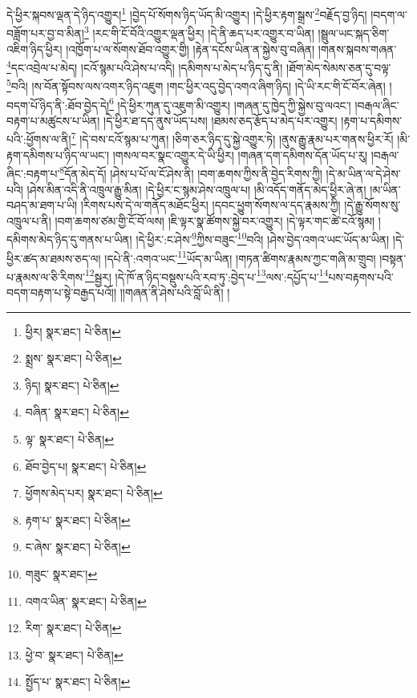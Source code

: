 དེ་ཕྱིར་སྐབས་ལྡན་དེ་ཉིད་འགྱུར།\footnote{ཕྱིར།  སྣར་ཐང་།  པེ་ཅིན། } །བྱེད་པོ་སོགས་ཉིད་ཡོད་མི་འགྱུར། །དེ་ཕྱིར་རྟག་སྒྲས་\footnote{སྨྲས་  སྣར་ཐང་།  པེ་ཅིན། }བརྗོད་བྱ་ཉིད། །བདག་ལ་བཟློག་པར་བྱ་བ་མིན།\footnote{ཉིད།  སྣར་ཐང་།  པེ་ཅིན། } །རང་གི་ངོ་བོའི་འགྱུར་ལྡན་ཕྱིར། །དེ་ནི་ཆད་པར་འགྱུར་བ་ཡིན། །སྦྲུལ་ཡང་སྐད་ཅིག་འཇིག་ཉིད་ཕྱིར། །འཁྱོག་པ་ལ་སོགས་ཐོབ་འགྱུར་གྱི། །རྟེན་དངོས་ཡིན་ན་སྐྱེས་བུ་བཞིན། །གནས་སྐབས་གཞན་\footnote{བཞིན་  སྣར་ཐང་།  པེ་ཅིན། }དང་འབྲེལ་པ་མེད། །ངའོ་སྙམ་པའི་ཤེས་པ་འདི། །དམིགས་པ་མེད་པ་ཉིད་དུ་ནི། །ཐོག་མེད་སེམས་ཅན་དུ་བལྟ་\footnote{ལྟ་  སྣར་ཐང་།  པེ་ཅིན། }བའི། །ས་བོན་སྟོབས་ལས་འགར་ཉིད་འཇུག །གང་ཕྱིར་འདུ་བྱེད་འགའ་ཞིག་ཉིད། །དེ་ཡི་རང་གི་ངོ་བོར་ཞེན། །བདག་པོ་ཉིད་ནི་:ཐོབ་བྱེད་དེ།\footnote{ཐོབ་བྱེད་པ།  སྣར་ཐང་།  པེ་ཅིན། } །དེ་ཕྱིར་ཀུན་དུ་འཇུག་མི་འགྱུར། །གཞན་དུ་ཁྱེད་ཀྱི་སྐྱེས་བུ་ལའང་། །བརྒལ་ཞིང་བརྟག་པ་མཚུངས་པ་ཡིན། །དེ་ཕྱིར་ཐ་དད་ནུས་ཡོད་པས། །ཐམས་ཅད་རྩོད་པ་མེད་པར་འགྱུར། །རྟག་པ་དམིགས་པའི་:ཕྱོགས་ལ་ནི།\footnote{ཕྱོགས་མེད་པར།  སྣར་ཐང་།  པེ་ཅིན། } །དེ་བས་ངའོ་སྙམ་པ་ཀུན། །ཅིག་ཅར་ཉིད་དུ་སྐྱེ་འགྱུར་ཏེ། །ནུས་རྒྱུ་རྣམ་པར་གནས་ཕྱིར་རོ། །མི་རྟག་དམིགས་པ་ཉིད་ལ་ཡང་། །གསལ་བར་སྣང་འགྱུར་དེ་ཡི་ཕྱིར། །གཞན་དག་དམིགས་དོན་ཡོད་པ་རུ། །བརྒལ་ཞིང་:བརྟག་པ་\footnote{རྟག་པ་  སྣར་ཐང་།  པེ་ཅིན། }དོན་མེད་དོ། །ཤེས་པ་པོ་ལ་ངོ་ཤེས་ནི། །བག་ཆགས་ཀྱིས་ནི་བྱེད་རིགས་ཀྱི། །དེ་མ་ཡིན་ལ་དེ་ཤེས་པའི། །ཤེས་མིན་འདི་ནི་འཁྲུལ་རྒྱུ་མིན། །དེ་ཕྱིར་ང་སྙམ་ཤེས་འཁྲུལ་པ། །མི་འདོད་གནོད་མེད་ཕྱིར་ཞེ་ན། །མ་ཡིན་བཤད་མ་ཐག་པ་ཡི། །རིགས་པས་དེ་ལ་གནོད་མཐོང་ཕྱིར། །དབང་ཕྱུག་སོགས་ལ་དད་རྣམས་ཀྱི། །དེ་རྒྱུ་སོགས་སུ་འཁྲུལ་པ་ནི། །བག་ཆགས་ཙམ་གྱི་ངོ་བོ་ལས། །ཇི་ལྟར་སྣ་ཚོགས་སྐྱེ་བར་འགྱུར། །དེ་ལྟར་གང་ཚེ་ངའོ་སྙམ། །དམིགས་མེད་ཉིད་དུ་གནས་པ་ཡིན། །དེ་ཕྱིར་:ང་ཤེས་\footnote{ང་ཞེས་  སྣར་ཐང་།  པེ་ཅིན། }ཀྱིས་བཟུང་\footnote{གཟུང་  སྣར་ཐང་། }བའི། །ཤེས་བྱེད་འགའ་ཡང་ཡོད་མ་ཡིན། །དེ་ཕྱིར་ཚད་མ་ཐམས་ཅད་ལ། །དཔེ་ནི་:འགའ་ཡང་\footnote{འགའ་ཡིན་  སྣར་ཐང་།  པེ་ཅིན། }ཡོད་མ་ཡིན། །གཏན་ཚིགས་རྣམས་ཀྱང་གཞི་མ་གྲུབ། །བསྟན་པ་རྣམས་ལ་ཅི་རིགས་\footnote{རིག་  སྣར་ཐང་།  པེ་ཅིན། }སྦྱར། །དེ་ཁོ་ན་ཉིད་བསྡུས་པའི་རབ་ཏུ་:བྱེད་པ་\footnote{ཕྱེ་བ་  སྣར་ཐང་།  པེ་ཅིན། }ལས་:དཔྱོད་པ་\footnote{སྤྱོད་པ་  སྣར་ཐང་།  པེ་ཅིན། }པས་བརྟགས་པའི་བདག་བརྟག་པ་སྟེ་བརྒྱད་པའོ།། །།གཞན་ནི་ཤེས་པའི་བློ་ཡི་ནི། །
